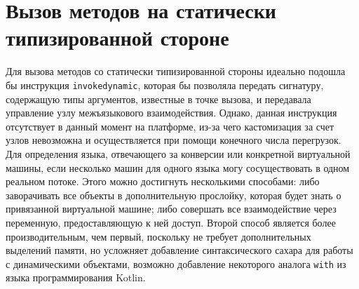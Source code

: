 \documentclass[times,specification,annotation]{itmo-student-thesis}
\begin{document}
\section{Вызов методов на статически типизированной стороне}
Для вызова методов со статически типизированной стороны идеально подошла бы инструкция \texttt{invokedynamic}, которая бы позволяла передать сигнатуру, содержащую типы аргументов, известные в точке вызова, и передавала управление узлу межъязыкового взаимодействия. Однако, данная инструкция отсутствует в данный момент на платформе, из-за чего кастомизация за счет узлов невозможна и осуществляется при помощи конечного числа перегрузок.\\
Для определения языка, отвечающего за конверсии или конкретной виртуальной машины, если несколько машин для одного языка могу сосуществовать в одном реальном потоке. Этого можно достигнуть несколькими способами: либо заворачивать все объекты в дополнительную прослойку, которая будет знать о привязанной виртуальной машине; либо совершать все взаимодействие через переменную, предоставляющую к ней доступ. Второй способ является более производительным, чем первый, поскольку не требует дополнительных выделений памяти, но усложняет добавление синтаксического сахара для работы с динамическими объектами, возможно добавление некоторого аналога \texttt{with} из языка программирования Kotlin.
\end{document}
